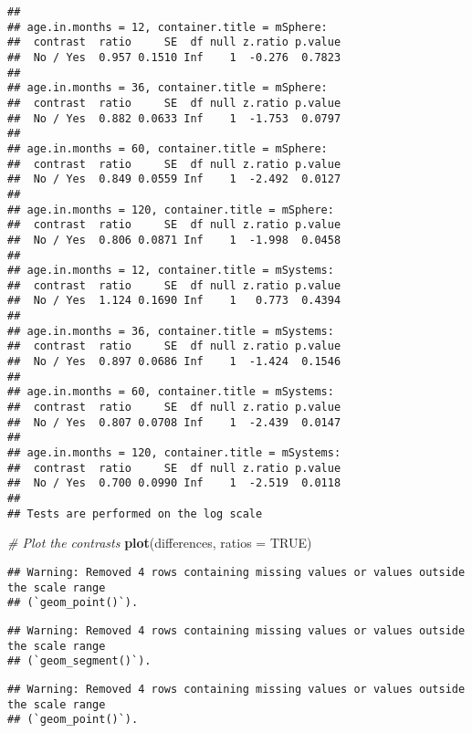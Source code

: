 \documentclass[
]{article}
\newenvironment{Shaded}{\begin{snugshade}}{\end{snugshade}}
\newcommand{\AttributeTok}[1]{\textcolor[rgb]{0.13,0.29,0.53}{#1}}
\newcommand{\CommentTok}[1]{\textcolor[rgb]{0.56,0.35,0.01}{\textit{#1}}}
\newcommand{\ConstantTok}[1]{\textcolor[rgb]{0.56,0.35,0.01}{#1}}
\newcommand{\FunctionTok}[1]{\textcolor[rgb]{0.13,0.29,0.53}{\textbf{#1}}}
\newcommand{\NormalTok}[1]{#1}
\begin{document}
\begin{verbatim}
## 
## age.in.months = 12, container.title = mSphere:
##  contrast  ratio     SE  df null z.ratio p.value
##  No / Yes  0.957 0.1510 Inf    1  -0.276  0.7823
## 
## age.in.months = 36, container.title = mSphere:
##  contrast  ratio     SE  df null z.ratio p.value
##  No / Yes  0.882 0.0633 Inf    1  -1.753  0.0797
## 
## age.in.months = 60, container.title = mSphere:
##  contrast  ratio     SE  df null z.ratio p.value
##  No / Yes  0.849 0.0559 Inf    1  -2.492  0.0127
## 
## age.in.months = 120, container.title = mSphere:
##  contrast  ratio     SE  df null z.ratio p.value
##  No / Yes  0.806 0.0871 Inf    1  -1.998  0.0458
## 
## age.in.months = 12, container.title = mSystems:
##  contrast  ratio     SE  df null z.ratio p.value
##  No / Yes  1.124 0.1690 Inf    1   0.773  0.4394
## 
## age.in.months = 36, container.title = mSystems:
##  contrast  ratio     SE  df null z.ratio p.value
##  No / Yes  0.897 0.0686 Inf    1  -1.424  0.1546
## 
## age.in.months = 60, container.title = mSystems:
##  contrast  ratio     SE  df null z.ratio p.value
##  No / Yes  0.807 0.0708 Inf    1  -2.439  0.0147
## 
## age.in.months = 120, container.title = mSystems:
##  contrast  ratio     SE  df null z.ratio p.value
##  No / Yes  0.700 0.0990 Inf    1  -2.519  0.0118
## 
## Tests are performed on the log scale
\end{verbatim}

\begin{Shaded}
\begin{Highlighting}[]
\CommentTok{\# Plot the contrasts}
\FunctionTok{plot}\NormalTok{(differences, }\AttributeTok{ratios =} \ConstantTok{TRUE}\NormalTok{)}
\end{Highlighting}
\end{Shaded}

\begin{verbatim}
## Warning: Removed 4 rows containing missing values or values outside the scale range
## (`geom_point()`).
\end{verbatim}

\begin{verbatim}
## Warning: Removed 4 rows containing missing values or values outside the scale range
## (`geom_segment()`).
\end{verbatim}

\begin{verbatim}
## Warning: Removed 4 rows containing missing values or values outside the scale range
## (`geom_point()`).
\end{verbatim}
\end{document}
